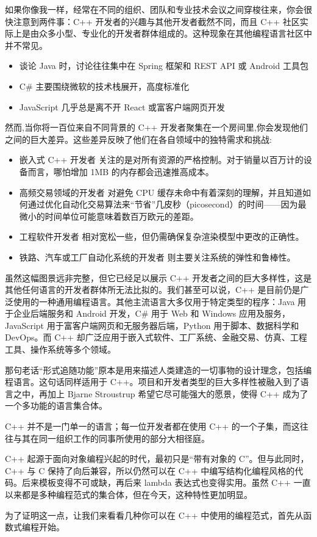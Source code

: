 
如果你像我一样，经常在不同的组织、团队和专业技术会议之间穿梭往来，你会很快注意到两件事：C++ 开发者的兴趣与其他开发者截然不同，而且 C++ 社区实际上是由众多小型、专业化的开发者群体组成的。这种现象在其他编程语言社区中并不常见。

\begin{itemize}
\item 
谈论 Java 时，讨论往往集中在 Spring 框架和 REST API 或 Android 工具包

\item 
C\# 主要围绕微软的技术栈展开，高度标准化

\item 
JavaScript 几乎总是离不开 React 或富客户端网页开发
\end{itemize}

然而,当你将一百位来自不同背景的 C++ 开发者聚集在一个房间里,你会发现他们之间的巨大差异。这些差异反映了他们在各自领域中的独特需求和挑战:

\begin{itemize}
\item 
嵌入式 C++ 开发者 关注的是对所有资源的严格控制。对于销量以百万计的设备而言，哪怕增加 1MB 的内存都会迅速推高成本。

\item 
高频交易领域的开发者 对避免 CPU 缓存未命中有着深刻的理解，并且知道如何通过优化自动化交易算法来“节省”几皮秒（picosecond）的时间——因为最微小的时间单位可能意味着数百万欧元的差距。

\item 
工程软件开发者 相对宽松一些，但仍需确保复杂渲染模型中更改的正确性。

\item 
铁路、汽车或工厂自动化系统的开发者 则主要关注系统的弹性和鲁棒性。
\end{itemize}

虽然这幅图景远非完整，但它已经足以展示 C++ 开发者之间的巨大多样性，这是其他任何语言的开发者群体所无法比拟的。我们甚至可以说，C++ 是目前仍是广泛使用的一种通用编程语言。其他主流语言大多仅用于特定类型的程序：Java 用于企业后端服务和 Android 开发，C\# 用于 Web 和 Windows 应用及服务，JavaScript 用于富客户端网页和无服务器后端，Python 用于脚本、数据科学和 DevOps。而 C++ 却广泛应用于嵌入式软件、工厂系统、金融交易、仿真、工程工具、操作系统等多个领域。

那句老话“形式追随功能”原本是用来描述人类建造的一切事物的设计理念，包括编程语言。这句话同样适用于 C++。项目和开发者类型的巨大多样性被融入到了语言之中，再加上 Bjarne Stroustrup 希望它尽可能强大的愿景，使得 C++ 成为了一个多功能的语言集合体。

C++ 并不是一门单一的语言；每一位开发者都在使用 C++ 的一个子集，而这往往与其在同一组织工作的同事所使用的部分大相径庭。

C++ 起源于面向对象编程兴起的时代，最初只是“带有对象的 C”。但与此同时，C++ 与 C 保持了向后兼容，所以仍然可以在 C++ 中编写结构化编程风格的代码。后来模板变得不可或缺，再后来 lambda 表达式也变得实用。虽然 C++ 一直以来都是多种编程范式的集合体，但在今天，这种特性更加明显。

为了证明这一点，让我们来看看几种你可以在 C++ 中使用的编程范式，首先从函数式编程开始。
